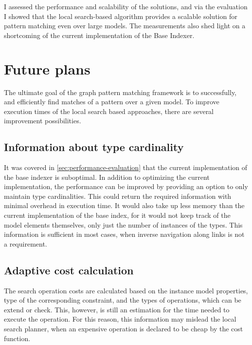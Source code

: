 I assessed the performance and scalability of the solutions, and via the evaluation I showed that the local search-based algorithm provides a scalable solution for pattern matching even over large models. The measurements also shed light on a shortcoming of the current implementation of the \eiq Base Indexer.



\section{Future plans}

The ultimate goal of the \eiq graph pattern matching framework is to successfully, and efficiently find matches of a pattern over a given model. To improve execution times of the local search based approaches, there are several improvement possibilities.

\subsection{Information about type cardinality}
It was covered in \autoref{sec:performance-evaluation} that the current implementation of the base indexer is suboptimal. In addition to optimizing the current implementation, the performance can be improved by providing an option to only maintain type cardinalities. This could return the required information with minimal overhead in execution time. It would also take up less memory than the current implementation of the base index, for it would not keep track of the model elements themselves, only just the number of instances of the types. This information is sufficient in most cases, when inverse navigation along links is not a requirement.

\subsection{Adaptive cost calculation}
The search operation costs are calculated based on the instance model properties, type of the corresponding constraint, and the types of operations, which can be extend or check. This, however, is still an estimation for the time needed to execute the operation. For this reason, this information may mislead the local search planner, when an expensive operation is declared to be cheap by the cost function. 

